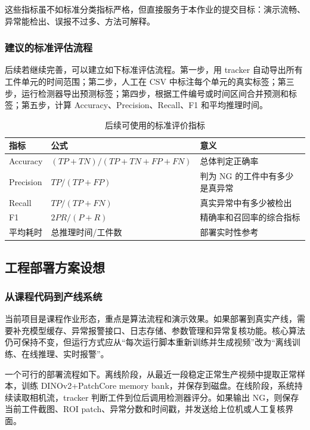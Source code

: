 \documentclass[12pt,hyperref,a4paper,UTF8,fontset=fandol]{ctexart}
\begin{document}
这些指标虽不如标准分类指标严格，但直接服务于本作业的提交目标：演示流畅、异常能检出、误报不过多、方法可解释。

\subsubsection{建议的标准评估流程}

后续若继续完善，可以建立如下标准评估流程。第一步，用 tracker 自动导出所有工件单元的时间范围；第二步，人工在 CSV 中标注每个单元的真实标签；第三步，运行检测器导出预测标签；第四步，根据工件编号或时间区间合并预测和标签；第五步，计算 Accuracy、Precision、Recall、F1 和平均推理时间。

\begin{table}[H]
    \centering
    \begin{tabular}{lll}
        \toprule
        指标 & 公式 & 意义 \\
        \midrule
        Accuracy & $(TP+TN)/(TP+TN+FP+FN)$ & 总体判定正确率 \\
        Precision & $TP/(TP+FP)$ & 判为 NG 的工件中有多少是真异常 \\
        Recall & $TP/(TP+FN)$ & 真实异常中有多少被检出 \\
        F1 & $2PR/(P+R)$ & 精确率和召回率的综合指标 \\
        平均耗时 & 总推理时间/工件数 & 部署实时性参考 \\
        \bottomrule
    \end{tabular}
    \caption{后续可使用的标准评价指标}
\end{table}

\newpage
\subsection{工程部署方案设想}

\subsubsection{从课程代码到产线系统}

当前项目是课程作业形态，重点是算法流程和演示效果。如果部署到真实产线，需要补充模型缓存、异常报警接口、日志存储、参数管理和异常复核功能。核心算法仍可保持不变，但运行方式应从“每次运行脚本重新训练并生成视频”改为“离线训练、在线推理、实时报警”。

一个可行的部署流程如下。离线阶段，从最近一段稳定正常生产视频中提取正常样本，训练 DINOv2+PatchCore memory bank，并保存到磁盘。在线阶段，系统持续读取相机流，tracker 判断工件到位后调用检测器评分。如果输出 NG，则保存当前工件截图、ROI patch、异常分数和时间戳，并发送给上位机或人工复核界面。
\end{document}
